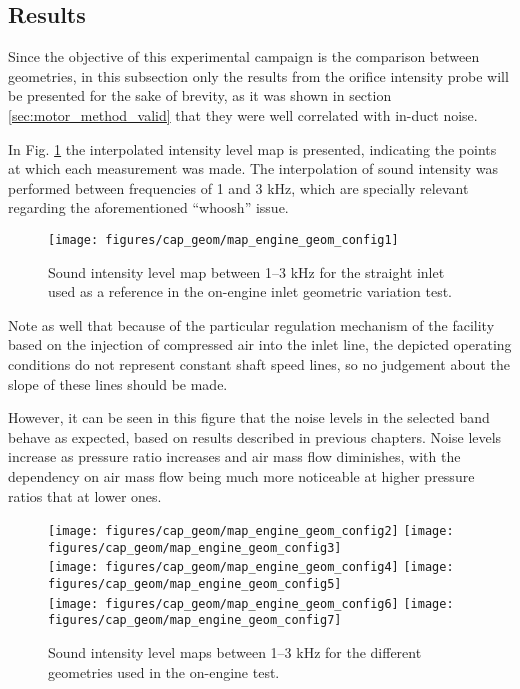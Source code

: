 \subsection{Results}

Since the objective of this experimental campaign is the comparison between geometries, in this subsection only the results from the orifice intensity probe will be presented for the sake of brevity, as it was shown in section \ref{sec:motor_method_valid} that they were well correlated with in-duct noise.

In Fig. \ref{fig:geom_mot_comparison_map1} the interpolated intensity level map is presented, indicating the points at which each measurement was made. The interpolation of sound intensity was performed between frequencies of 1 and 3 kHz, which are specially relevant regarding the aforementioned ``whoosh'' issue.

\begin{figure}[htb!]
\centering
\texttt{[image: figures/cap\_geom/map\_engine\_geom\_config1]}
\caption{Sound intensity level map between 1--3 kHz for the straight inlet used as a reference in the on-engine inlet geometric variation test.}
\label{fig:geom_mot_comparison_map1}
\end{figure}

Note as well that because of the particular regulation mechanism of the facility based on the injection of compressed air into the inlet line, the depicted operating conditions do not represent constant shaft speed lines, so no judgement about the slope of these lines should be made.

However, it can be seen in this figure that the noise levels in the selected band behave as expected, based on results described in previous chapters. Noise levels increase as pressure ratio increases and air mass flow diminishes, with the dependency on air mass flow being much more noticeable at higher pressure ratios that at lower ones.

\begin{figure}[htb!]
\centering
\texttt{[image: figures/cap\_geom/map\_engine\_geom\_config2]}\hspace{0.05\textwidth}
\texttt{[image: figures/cap\_geom/map\_engine\_geom\_config3]}\\[2mm]
\texttt{[image: figures/cap\_geom/map\_engine\_geom\_config4]}\hspace{0.05\textwidth}
\texttt{[image: figures/cap\_geom/map\_engine\_geom\_config5]}\\[2mm]
\texttt{[image: figures/cap\_geom/map\_engine\_geom\_config6]}\hspace{0.05\textwidth}
\texttt{[image: figures/cap\_geom/map\_engine\_geom\_config7]}
\caption{Sound intensity level maps between 1--3 kHz for the different geometries used in the on-engine test.}
\label{fig:geom_mot_comparison_maps}
\end{figure}

